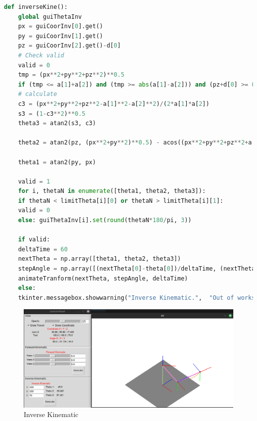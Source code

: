 \vspace{0.5cm}
\begin{lstlisting}[language=python]
	def inverseKine():
	global guiThetaInv
	px = guiCoorInv[0].get()
	py = guiCoorInv[1].get()
	pz = guiCoorInv[2].get()-d[0]
	# Check valid
	valid = 0
	tmp = (px**2+py**2+pz**2)**0.5
	if (tmp <= a[1]+a[2]) and (tmp >= abs(a[1]-a[2])) and (pz+d[0] >= 0): 
	# calculate
	c3 = (px**2+py**2+pz**2-a[1]**2-a[2]**2)/(2*a[1]*a[2])
	s3 = (1-c3**2)**0.5
	theta3 = atan2(s3, c3)
	
	theta2 = atan2(pz, (px**2+py**2)**0.5) - acos((px**2+py**2+pz**2+a[1]**2-a[2]**2)/(2*a[1]*(px**2+py**2+pz**2)**0.5))
	
	theta1 = atan2(py, px)
	
	valid = 1
	for i, thetaN in enumerate([theta1, theta2, theta3]):
	if thetaN < limitTheta[i][0] or thetaN > limitTheta[i][1]:
	valid = 0
	else: guiThetaInv[i].set(round(thetaN*180/pi, 3))
	
	if valid:
	deltaTime = 60
	nextTheta = np.array([theta1, theta2, theta3])
	stepAngle = np.array([(nextTheta[0]-theta[0])/deltaTime, (nextTheta[1]-theta[1])/deltaTime, (nextTheta[2]-theta[2])/deltaTime])
	animateTranform(nextTheta, stepAngle, deltaTime)
	else:
	tkinter.messagebox.showwarning("Inverse Kinematic.",  "Out of workspace")
\end{lstlisting}

\begin{figure}[H]
	\centering
	\includegraphics[width=1\linewidth]{Images/inv_demo.png}
	\caption{Inverse Kinematic}
	\label{fig:enter-label9}
\end{figure}